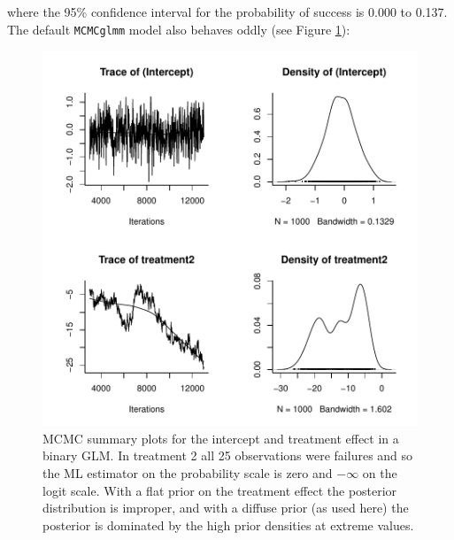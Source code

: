 \documentclass{article}
\begin{document}
where the  95\% confidence interval for the probability of success is  0.000 to 0.137.\\

The default \texttt{MCMCglmm} model also behaves oddly (see Figure \ref{separation1-fig}):

\begin{Schunk}
\end{Schunk}



\begin{figure}[!h]
\begin{center}
\includegraphics{Lecture2-081}
\end{center}
\caption{MCMC summary plots for the intercept and treatment effect in a binary GLM. In treatment 2 all 25 observations were failures and so the ML estimator on the probability scale is zero and $-\infty$ on the logit scale. With a flat prior on the treatment effect the posterior distribution is improper, and with a diffuse prior (as used here) the posterior is dominated by the high prior densities at extreme values.}
\label{separation1-fig}
\end{figure}
\end{document}

